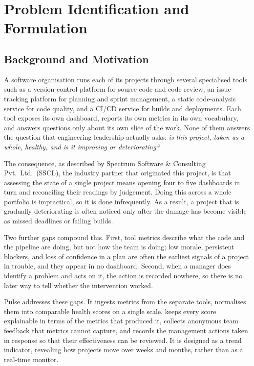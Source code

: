 \chapter{Problem Identification and Formulation}
\label{ch:problem}

\section{Background and Motivation}
\label{sec:background}

A software organisation runs each of its projects through several specialised
tools such as a version-control platform for source code and code review, an
issue-tracking platform for planning and sprint management, a static
code-analysis service for code quality, and a CI/CD service for builds and
deployments. Each tool exposes its own dashboard, reports its own metrics in its
own vocabulary, and answers questions only about its own slice of the work.
None of them answers the question that engineering leadership actually asks:
\emph{is this project, taken as a whole, healthy, and is it improving or
deteriorating?}

The consequence, as described by Spectrum Software \& Consulting Pvt.\ Ltd.\
(SSCL), the industry partner that originated this project, is that assessing the state of a single project means opening
four to five dashboards in turn and reconciling their readings by judgement.
Doing this across a whole portfolio is impractical, so it is done
infrequently. As a result, a project that is gradually deteriorating is often
noticed only after the damage has become visible as missed deadlines or failing
builds.

Two further gaps compound this. First, tool metrics describe what the code and
the pipeline are doing, but not how the team is doing; low morale, persistent
blockers, and loss of confidence in a plan are often the earliest signals of a
project in trouble, and they appear in no dashboard. Second, when a manager does
identify a problem and acts on it, the action is recorded nowhere, so there is
no later way to tell whether the intervention worked.

Pulse addresses these gaps. It ingests metrics from the separate tools,
normalises them into comparable health scores on a single scale, keeps every
score explainable in terms of the metrics that produced it, collects anonymous
team feedback that metrics cannot capture, and records the management actions
taken in response so that their effectiveness can be reviewed. It is designed as
a trend indicator, revealing how projects move over weeks and months, rather
than as a real-time monitor.

